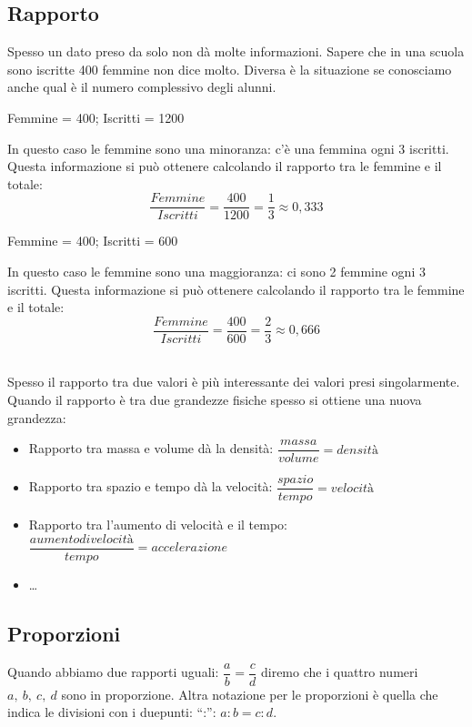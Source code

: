 \subsection{Rapporto}

Spesso un dato preso da solo non dà molte informazioni. Sapere che in una 
scuola sono iscritte 400 femmine non dice molto. Diversa è la situazione se 
conosciamo anche qual è il numero complessivo degli alunni.

\begin{minipage}{.49\textwidth}
 Femmine = 400; \quad Iscritti = 1200
 
 In questo caso le femmine sono una minoranza: c'è una femmina ogni 3 
iscritti. Questa informazione si può ottenere calcolando il rapporto tra le 
femmine e il totale:
\[\frac{Femmine}{Iscritti} = \frac{400}{1200} = \frac{1}{3} \approx 0,333\]
\end{minipage}
\begin{minipage}{.49\textwidth}
 Femmine = 400; \quad Iscritti = 600
 
 In questo caso le femmine sono una maggioranza: ci sono 2 femmine ogni 3 
iscritti. Questa informazione si può ottenere calcolando il rapporto tra le 
femmine e il totale:
\[\frac{Femmine}{Iscritti} = \frac{400}{600} = \frac{2}{3} \approx 0,666\]
\end{minipage}\\

Spesso il rapporto tra due valori è più interessante dei valori presi 
singolarmente. 
Quando il rapporto è tra due grandezze fisiche spesso si 
ottiene una nuova grandezza:
\begin{itemize} [noitemsep]
 \item Rapporto tra massa e volume dà la densità: 
 \(\dfrac{massa}{volume}=densità\)
 \item Rapporto tra spazio e tempo dà la velocità: 
 \(\dfrac{spazio}{tempo}=velocità\)
 \item Rapporto tra l'aumento di velocità e il tempo: 
 \(\dfrac{aumento di velocità}{tempo}=accelerazione\)
 \item \dots
\end{itemize}

\subsection{Proporzioni}

Quando abbiamo due rapporti uguali: \(\dfrac{a}{b} = \dfrac{c}{d}\) diremo 
che i quattro numeri \(a,~b,~c,~d\) sono in proporzione. Altra notazione 
per le proporzioni è quella che indica le divisioni con i duepunti: ``:'':
\(a:b=c:d\).

